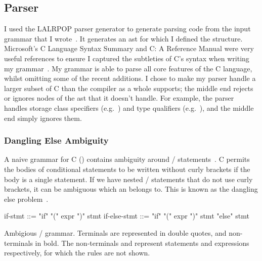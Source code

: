 \documentclass[00-main.tex]{subfiles}
\begin{document}
\subsection{Parser}

I used the LALRPOP parser generator to generate parsing code from the input grammar that I wrote~.
It generates an \gls{ast} for which I defined the structure.
Microsoft's C Language Syntax Summary and C: A Reference Manual were very useful references to ensure I captured the subtleties of C's syntax when writing my grammar~. %
My grammar is able to parse all core features of the C language, whilst omitting some of the recent additions. I chose to make my parser handle a larger subset of C than the compiler as a whole supports; the middle end rejects or ignores nodes of the \gls{ast} that it doesn't handle. For example, the parser handles storage class specifiers (e.g.~) and type qualifiers (e.g.~), and the middle end simply ignores them.

\subsubsection{Dangling Else Ambiguity}

A naive grammar for C () contains ambiguity around / statements~.
C permits the bodies of conditional statements to be written without curly brackets if the body is a single statement.
If we have nested / statements that do not use curly brackets, it can be ambiguous which  an  belongs to. This is known as the dangling else problem~.

\begin{listing}[t]
  \begin{GrammarListing}
    if-stmt      ::= "if" "(" expr ")" stmt
    if-else-stmt ::= "if" "(" expr ")" stmt "else" stmt
  \end{GrammarListing}
  \caption{
    Ambigious / grammar.
    Terminals are represented in double quotes, and non-terminals in bold.
    The non-terminals  and  represent statements and expressions respectively, for which the rules are not shown.
  }
  \label{lst:ambiguous if-else grammar}
\end{listing}
\end{document}
